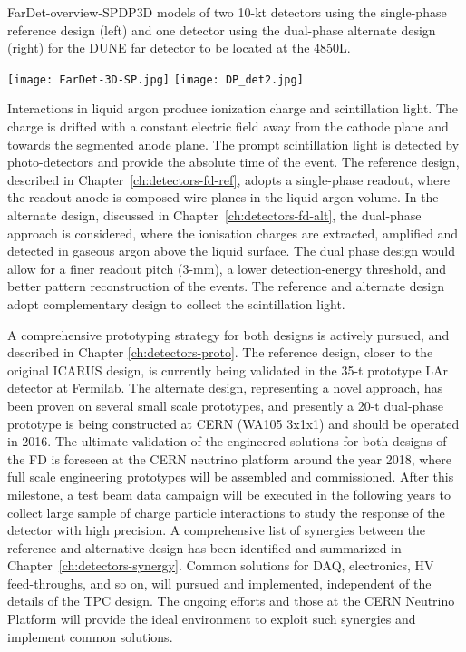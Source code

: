 \begin{cdrfigure}{FarDet-overview-SPDP}{3D models of two 10-kt detectors using the single-phase reference design (left) and one detector using the dual-phase alternate design (right) for the DUNE far detector to be located at the 4850L. }
\centering
\begin{minipage}[b]{1.0\textwidth}
\begin{center}
\texttt{[image: FarDet-3D-SP.jpg]}
\texttt{[image: DP\_det2.jpg]}
\end{center}
\end{minipage}
\end{cdrfigure}

Interactions in liquid argon produce ionization charge and scintillation light.
The charge is drifted with a constant electric field away from the cathode
plane and towards the segmented anode plane. 
The prompt scintillation light
is detected by photo-detectors and provide the absolute time of the event.
The reference design, described in Chapter~\ref{ch:detectors-fd-ref},
adopts a single-phase readout, where the readout anode is composed wire planes in the liquid argon volume. 
In the alternate design, discussed in Chapter~\ref{ch:detectors-fd-alt}, the  dual-phase approach is considered, where the 
ionisation charges are extracted, amplified and detected in gaseous argon above the liquid surface. 
The dual phase design would allow for a finer readout pitch (3-mm), 
a lower detection-energy threshold, and better pattern reconstruction of the events.
The reference and alternate design adopt complementary design 
to collect the scintillation light.

A  comprehensive prototyping strategy for both designs is actively pursued, and described in Chapter \ref{ch:detectors-proto}.
The reference design, closer to the original ICARUS design, is currently being validated in the 35-t prototype LAr detector at Fermilab.  The alternate design, representing a novel approach, has been proven on several
small scale prototypes, and presently
a 20-t dual-phase prototype is being constructed at CERN (WA105 3x1x1) and should be operated in 2016. 
The ultimate validation of the engineered solutions for both designs of the FD is foreseen at 
the CERN neutrino platform around the year 2018, where full scale engineering prototypes will be 
assembled and commissioned. After this milestone, a test beam data 
campaign will be executed in the following years to collect large sample of charge particle interactions
to study the response of the detector with high precision.
A comprehensive list of synergies between the reference and alternative design has been identified and summarized in Chapter~\ref{ch:detectors-synergy}. Common solutions for DAQ, electronics, HV feed-throughs, and so on, will pursued and implemented, independent of the details of the TPC design. The ongoing efforts and those at the CERN Neutrino Platform will
provide the ideal environment to exploit such synergies and implement common solutions.

